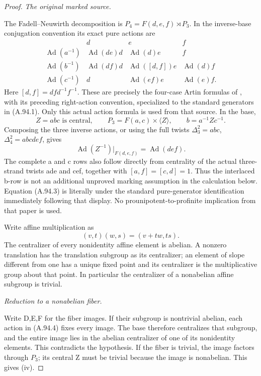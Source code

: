 \begin{proof}
\emph{The original marked source.}\par
The Fadell--Neuwirth decomposition is
\(P_4=F(d,e,f)\rtimes P_3\). In the inverse-base conjugation
convention its exact pure actions are
\[
\begin{array}{c|ccc}
 &d&e&f\\ \hline
 \operatorname{Ad}(a^{-1})&\operatorname{Ad}(de)d&\operatorname{Ad}(d)e&f\\
 \operatorname{Ad}(b^{-1})&\operatorname{Ad}(df)d&\operatorname{Ad}([d,f])e&\operatorname{Ad}(d)f\\
 \operatorname{Ad}(c^{-1})&d&\operatorname{Ad}(ef)e&\operatorname{Ad}(e)f.
\end{array}
\tag{A.94.4}
\]
Here \([d,f]=dfd^{-1}f^{-1}\). These are precisely the
four-case Artin formulas of \citet[Example~1.1,
pp.~465--466]{CECohen2010}, with its preceding right-action
convention, specialized to the standard generators in
(A.94.1). Only this actual action formula is used from that
source. In the base,
\[
 Z=abc\text{ is central},\qquad P_3=F(a,c)\times\langle Z\rangle,
 \qquad b=a^{-1}Zc^{-1}.
\]
Composing the three inverse actions, or using the full twists
\(\Delta_3^2=abc\), \(\Delta_4^2=abcdef\), gives
\[
          \operatorname{Ad}(Z^{-1})|_{F(d,e,f)}=\operatorname{Ad}(def).
\tag{A.94.5}
\]
The complete a and c rows also follow directly from centrality
of the actual three-strand twists ade and cef, together with
\([a,f]=[c,d]=1\). Thus the interlaced b-row is not an
additional unproved marking assumption in the calculation below.
Equation (A.94.3) is literally
\citet[p.~547, Eq.~(4)]{Furusho2010} under the standard
pure-generator identification immediately following that
display. No prounipotent-to-profinite implication from that
paper is used.

Write affine multiplication as
\[
                 (v,t)(w,s)=(v+tw,ts).
\]
The centralizer of every nonidentity affine element is abelian.
A nonzero translation has the translation subgroup as its
centralizer; an element of slope different from one has a
unique fixed point and its centralizer is the multiplicative
group about that point. In particular the centralizer of a
nonabelian affine subgroup is trivial.

\emph{Reduction to a nonabelian fiber.}\par
Write D,E,F for the fiber images. If their subgroup is nontrivial
abelian, each action in (A.94.4) fixes every image. The base
therefore centralizes that subgroup, and the entire image lies
in the abelian centralizer of one of its nonidentity elements.
This contradicts the hypothesis. If the fiber is trivial,
the image factors through \(P_3\); its central Z must be
trivial because the image is nonabelian. This gives (iv).


\end{proof}
